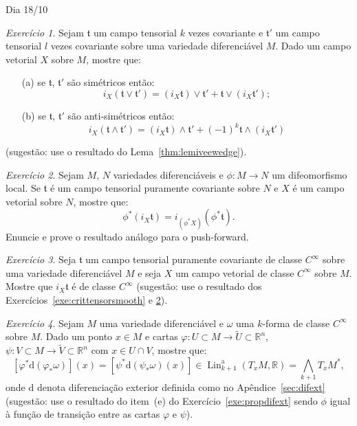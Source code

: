 \documentclass[oneside,11pt]{amsart}
\newcommand{\R}{\mathds R}
\newcommand{\dd}{\mathrm d}
\DeclareMathOperator{\Lin}{Lin}
\theoremstyle{remark}\newtheorem{exercise}{Exercício}[section]
\theoremstyle{plain}\newtheorem{teo}{Teorema}[section]
\theoremstyle{plain}\newtheorem{lem}[teo]{Lema}
\theoremstyle{plain}\newtheorem{prop}[teo]{Proposição}
\theoremstyle{definition}\newtheorem{defin}[teo]{Definição}
\theoremstyle{remark}\newtheorem{rem}[teo]{Observação}
\theoremstyle{definition}\newtheorem{example}[teo]{Exemplo}
\numberwithin{equation}{section}
\begin{document}
\begin{section}{Dia 18/10}
\begin{exercise}\label{exe:propiXomega}
Sejam $\mathfrak t$ um campo tensorial $k$ vezes covariante e $\mathfrak t'$ um campo tensorial $l$ vezes covariante sobre uma variedade diferenciável $M$.
Dado um campo vetorial $X$ sobre $M$, mostre que:
\begin{itemize}
\item[(a)] se $\mathfrak t$, $\mathfrak t'$ são simétricos então:
\[i_X(\mathfrak t\vee\mathfrak t')=(i_X\mathfrak t)\vee\mathfrak t'+\mathfrak t\vee(i_X\mathfrak t');\]
\item[(b)] se $\mathfrak t$, $\mathfrak t'$ são anti-simétricos então:
\[i_X(\mathfrak t\wedge\mathfrak t')=(i_X\mathfrak t)\wedge\mathfrak t'+(-1)^k\mathfrak t\wedge(i_X\mathfrak t')\]
\end{itemize}
(sugestão: use o resultado do Lema~\ref{thm:lemiveewedge}).
\end{exercise}

\begin{exercise}\label{exe:pulliXt}
Sejam $M$, $N$ variedades diferenciáveis e $\phi:M\to N$ um difeomorfismo local. Se $\mathfrak t$ é um campo tensorial puramente covariante
sobre $N$ e $X$ é um campo vetorial sobre $N$, mostre que:
\[\phi^*(i_X\mathfrak t)=i_{(\phi^*X)}(\phi^*\mathfrak t).\]
Enuncie e prove o resultado análogo para o push-forward.
\end{exercise}

\begin{exercise}
Seja $\mathfrak t$ um campo tensorial puramente covariante de classe $C^\infty$ sobre uma variedade diferenciável $M$ e seja $X$ um campo vetorial
de classe $C^\infty$ sobre $M$. Mostre que $i_X\mathfrak t$ é de classe $C^\infty$ (sugestão: use o resultado dos Exercícios~\ref{exe:crittensorsmooth}
e \ref{exe:pulliXt}).
\end{exercise}

\begin{exercise}\label{exe:difextindcarta}
Sejam $M$ uma variedade diferenciável e $\omega$ uma $k$-forma de classe $C^\infty$ sobre $M$. Dado um ponto $x\in M$ e cartas
$\varphi:U\subset M\to\widetilde U\subset\R^n$, $\psi:V\subset M\to\widetilde V\subset\R^n$ com $x\in U\cap V$, mostre que:
\[[\varphi^*\dd(\varphi_*\omega)](x)=[\psi^*\dd(\psi_*\omega)(x)]\in\Lin_{k+1}^{\mathrm a}(T_xM,\R)=\bigwedge_{k+1}T_xM^*,\]
onde $\dd$ denota diferenciação exterior definida como no Apêndice~\ref{sec:difext}
(sugestão: use o resultado do item~(e) do Exercício~\ref{exe:propdifext} sendo $\phi$ igual à função de transição
entre as cartas $\varphi$ e $\psi$).
\end{exercise}


\end{section}
\end{document}

